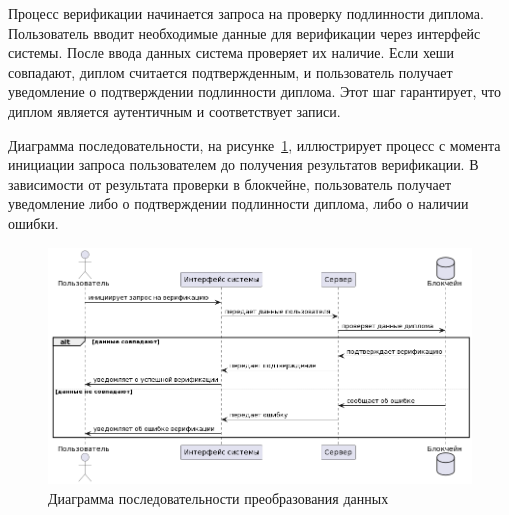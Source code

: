 Процесс верификации начинается запроса на проверку подлинности диплома. Пользователь вводит необходимые данные для верификации через интерфейс системы. После ввода данных система проверяет их наличие. Если хеши совпадают, диплом считается подтвержденным, и пользователь получает уведомление о подтверждении подлинности диплома. Этот шаг гарантирует, что диплом является аутентичным и соответствует записи.

Диаграмма последовательности, на рисунке~\ref{fig:diploma_verif_uscs}, иллюстрирует процесс с момента инициации запроса пользователем до получения результатов верификации. В зависимости от результата проверки в блокчейне, пользователь получает уведомление либо о подтверждении подлинности диплома, либо о наличии ошибки.

\begin{figure}[H]
	\centering
	\includegraphics[width=.9\textwidth]{images/diploma_verif_uscs.png}
	\parskip=6pt
	\caption{Диаграмма последовательности преобразования данных}
	\label{fig:diploma_verif_uscs}
\end{figure}

